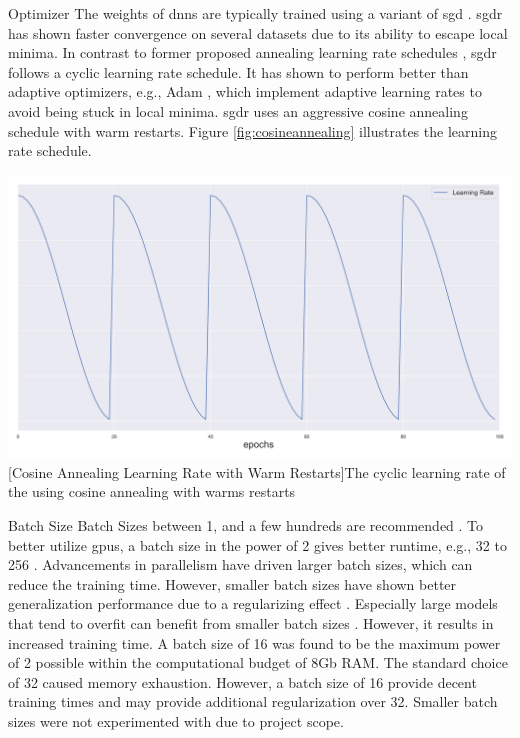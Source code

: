 \begin{enumdescript}
\begin{enumdescript}
		\item[Optimizer] The weights of \gls{dnn}s are typically trained using a variant of \gls{sgd} \cite{goodfellow_deep_2016}. \gls{sgdr} \cite{loshchilov_sgdr:_2016} has shown faster convergence on several datasets due to its ability to escape local minima. In contrast to former proposed annealing learning rate schedules \cite{}, \gls{sgdr} follows a cyclic learning rate schedule. It has shown to perform better than adaptive optimizers, e.g., Adam \cite{kingma_adam:_2014}, which implement adaptive learning rates to avoid being stuck in local minima.  \gls{sgdr} uses an aggressive cosine annealing schedule with warm restarts. Figure \ref{fig:cosineannealing} illustrates the learning rate schedule.
		
		\begin{minipage}[t]{\linewidth}
			\centering
			\includegraphics[width=.7\linewidth]{figures/lr.png}
			[Cosine Annealing Learning Rate with Warm Restarts]{The cyclic learning rate of the using cosine annealing with warms restarts} 
			\label{fig:cosineannealing}
		\end{minipage}
		
		\item[Batch Size] Batch Sizes between 1, and a few hundreds are recommended \cite{bengio_practical_2012}. To better utilize \gls{gpu}s, a batch size in the power of 2 gives better runtime, e.g., 32 to 256 \cite{goodfellow_deep_2016}. Advancements in parallelism \cite{dean_large_2012} have driven larger batch sizes, which can reduce the training time. However, smaller batch sizes have shown better generalization performance due to a regularizing effect \cite{masters_revisiting_nodate}. Especially large models that tend to overfit can benefit from smaller batch sizes \cite{goodfellow_deep_2016}. However, it results in increased training time.
		A batch size of 16 was found to be the maximum power of 2 possible within the computational budget of 8Gb RAM. The standard choice of 32 caused memory exhaustion. However, a batch size of 16 provide decent training times and may provide additional regularization over 32. Smaller batch sizes were not experimented with due to project scope.
		

\end{enumdescript}
\end{enumdescript}

